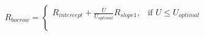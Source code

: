 \documentclass[preview]{standalone}
\begin{document}
\begin{align*}
R_{borrow} = \begin{cases} R_{intercept} + \frac{ U }{ U _{ optimal }}R_{ slope1 }, & \text{if }  U  \leq  U _{ optimal } \\[6pt] & \text{ } \\ & \text{ } \end{cases}
\end{align*}
\end{document}
